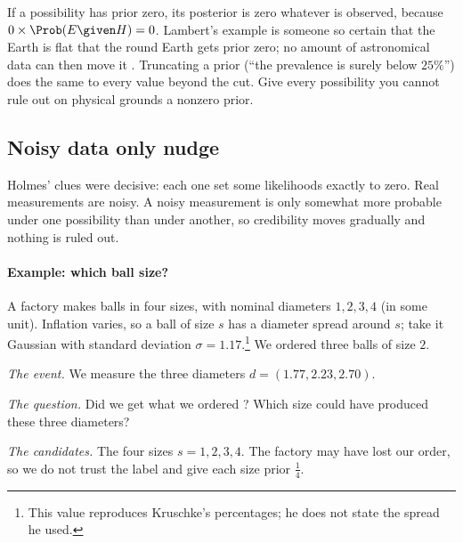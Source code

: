 \begin{pitfall}
If a possibility has prior zero, its posterior is zero whatever is observed, because
$0\times\Prob(E\given H)=0$. Lambert's example is someone so certain that the Earth
is flat that the round Earth gets prior zero; no amount of astronomical data can
then move it . Truncating a prior (``the prevalence is surely
below $25\%$'') does the same to every value beyond the cut. Give every possibility
you cannot rule out on physical grounds a nonzero prior.
\end{pitfall}

\subsection{Noisy data only nudge}

Holmes' clues were decisive: each one set some likelihoods exactly to zero. Real
measurements are noisy. A noisy measurement is only somewhat more probable under one
possibility than under another, so credibility moves gradually and nothing is
ruled out.

\paragraph{Example: which ball size?}
A factory makes balls in four sizes, with nominal diameters $1,2,3,4$ (in some
unit). Inflation varies, so a ball of size $s$ has a diameter spread around $s$; take
it Gaussian with standard deviation $\sigma=1.17$.\footnote{This value reproduces
Kruschke's percentages; he does not state the spread he used.} We ordered three balls
of size $2$.

\emph{The event.} We measure the three diameters $d=(1.77,2.23,2.70)$.

\emph{The question.} Did we get what we ordered
? Which size could have produced these three
diameters?

\emph{The candidates.} The four sizes $s=1,2,3,4$. The factory may have lost our
order, so we do not trust the label and give each size prior $\frac14$.

